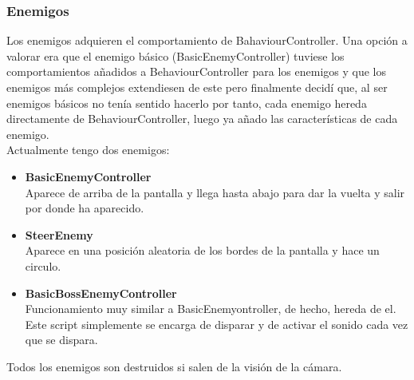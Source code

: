 \documentclass[titlepage, 4apaper]{article}
\begin{document}
\subsubsection{Enemigos}
Los enemigos adquieren el comportamiento de BahaviourController. Una opción a valorar era que el enemigo básico (BasicEnemyController) tuviese los comportamientos añadidos a BehaviourController para los enemigos y que los enemigos más complejos extendiesen de este pero finalmente decidí que, al ser enemigos básicos no tenía sentido hacerlo por tanto, cada enemigo hereda directamente de BehaviourController, luego ya añado las características de cada enemigo.\\Actualmente tengo dos enemigos:
\begin{itemize}
	\item \textbf{BasicEnemyController}\\Aparece de arriba de la pantalla y llega hasta abajo para dar la vuelta y salir por donde ha aparecido.
	\item \textbf{SteerEnemy}\\Aparece en una posición aleatoria de los bordes de la pantalla y hace un circulo.
	\item \textbf{BasicBossEnemyController}\\Funcionamiento muy similar a BasicEnemyontroller, de hecho, hereda de el. Este script simplemente se encarga de disparar y de activar el sonido cada vez que se dispara.
\end{itemize}
Todos los enemigos son destruidos si salen de la visión de la cámara.
\end{document}

